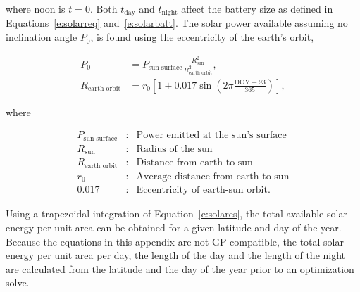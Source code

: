     where noon is $t=0$. Both $t_{\text{day}}$ and $t_{\text{night}}$ affect the battery size as defined in Equations~\eqref{e:solarreq} and~\eqref{e:solarbatt}. The solar power available assuming no inclination angle $P_0$, is found using the eccentricity of the earth's orbit, 

    \begin{align}
        \label{e:solarp0}
        P_0 & = P_{\text{sun surface}} \frac{R_{\text{sun}}^2}{R_{\text{earth orbit}}^2}, \\
        \label{e:solareo}
        R_{\text{earth orbit}} & = r_0 \left[ 1 + 0.017 \sin{\left( 2\pi \frac{\text{DOY}-93}{365}\right)} \right],
    \end{align}
    
    where 

    \[ \begin{array}{lcl}
        P_{\text{sun surface}} & : & \text{Power emitted at the sun's surface} \\
        R_{\text{sun}} & : & \text{Radius of the sun} \\
        R_{\text{earth orbit}} & : & \text{Distance from earth to sun} \\
        r_0 & : & \text{Average distance from earth to sun} \\
        0.017 & : & \text{Eccentricity of earth-sun orbit}.
    \end{array} \]

    Using a trapezoidal integration of Equation~\eqref{e:solares}, the total available solar energy per unit area can be obtained for a given latitude and day of the year. Because the equations in this appendix are not GP compatible, the total solar energy per unit area per day, the length of the day and the length of the night are calculated from the latitude and the day of the year prior to an optimization solve.






